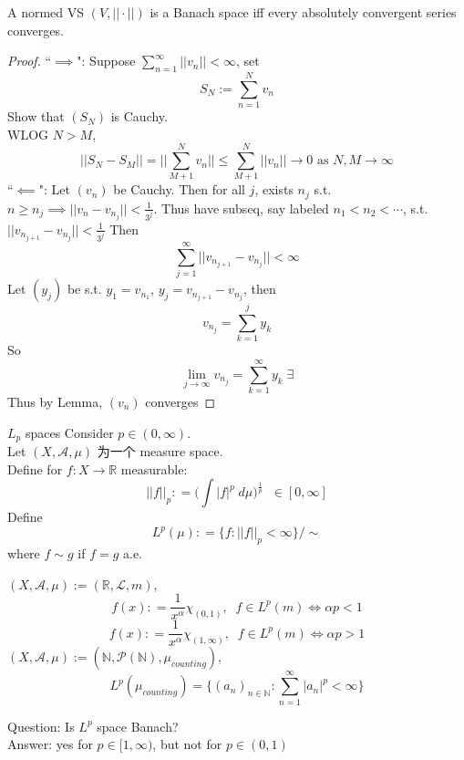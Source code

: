 \documentclass[lang=cn,11pt]{elegantbook}
\begin{document}
\begin{theorem}
    A normed VS $(V,||\cdot||)$ is a Banach space iff every absolutely convergent series converges.
\end{theorem}
\begin{proof}
    ``$\implies$": Suppose $\sum_{n=1}^\infty ||v_n|| < \infty$, set \[
    S_N := \sum_{n=1}^N v_n 
    \] Show that $(S_N)$ is Cauchy.\\
    WLOG $N>M$, \[
    ||S_N - S_M||  = ||\sum_{M+1}^N v_n|| \leq \sum_{M+1}^N ||v_n|| \to 0 \text{ as } N,M \to \infty 
    \]
    ``$\impliedby$": Let $(v_n)$ be Cauchy. Then for all $j$, exists $n_j$ s.t. $n \geq n_j \implies ||v_n  - v_{n_j} || < \frac{1}{3^j}$. 
    Thus have subseq, say labeled $n_1 < n_2 < \cdots $, s.t. $||v_{n_{j+1}} - v_{n_j}|| < \frac{1}{3^j} $
    Then \[
    \sum_{j=1}^\infty ||v_{n_{j+1}} - v_{n_j}|| < \infty
    \]
    Let $(y_j)$ be s.t. $y_1 = v_{n_1}$, $y_j = v_{n_{j+1}} - v_{n_j}$, then \[
    v_{n_j} = \sum_{k=1}^j y_k
    \]
    So \[
    \lim_{j\to \infty} v_{n_j}  = \sum_{k=1}^\infty y_k \;\exists
    \]
    Thus by Lemma, $(v_n)$ converges
\end{proof}

\begin{definition}{$L_p$ spaces}
    Consider $p\in(0,\infty)$.\\
    Let $(X,\mathcal{A},\mu)$ 为一个 measure space.\\
    Define for $f: X \to \mathbb{R}$ measurable: \[
    ||f||_p : = \Big(\int |f|^p \; d\mu  \Big)^{\frac{1}{p}} \;\; \in [0,\infty]
    \]
    Define \[
    L^p(\mu) : = \{ f :  ||f||_p  < \infty \} / \sim
    \] where $f \sim g$ if $f=g$ a.e.
\end{definition}



\begin{example}
    $(X,\mathcal{A},\mu) := (\mathbb{R},\mathcal{L}, m)$, \[
    f(x) : = \frac{1}{x^\alpha} \chi_{(0,1)}, \;\; f\in L^p(m) \Longleftrightarrow   \alpha p < 1
    \]  \[
    f(x) : = \frac{1}{x^\alpha} \chi_{(1,\infty)}, \;\; f\in L^p(m) \Longleftrightarrow   \alpha p > 1
    \]
    $(X,\mathcal{A},\mu) := (\mathbb{N},\mathcal{P}(\mathbb{N}), \mu_{counting})$, \[
    L^p( \mu_{counting}) = \{ (a_n)_{n\in\mathbb{N}} : \sum_{n=1}^\infty |a_n|^p < \infty   \}
    \]
\end{example}

Question: Is $L^p$ space Banach?\\
Answer: yes for $p\in [1,\infty)$, but not for $p \in (0,1)$
\end{document}
